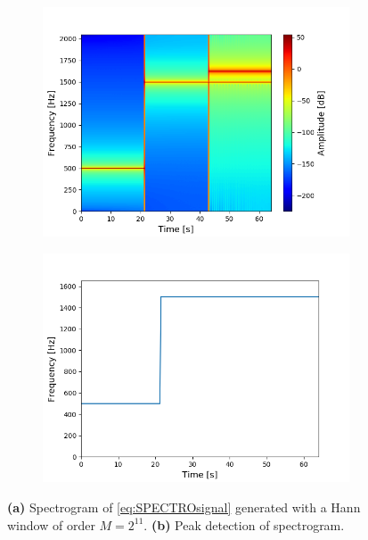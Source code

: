 \begin{figure}[H]
\centering
\begin{subfigure}{0.49\textwidth}
\centering
\includegraphics[width=\textwidth]{figures/validation/stft/peak/spectro2048.png}
\caption{}
\label{fig:2048spec}
\end{subfigure}
\begin{subfigure}{0.49\textwidth}
\centering
\includegraphics[width=\textwidth]{figures/validation/stft/peak/peak2048.png}
\caption{}
\label{fig:2048peak}
\end{subfigure}
\caption{\textbf{(a)} Spectrogram of \eqref{eq:SPECTROsignal} generated with a Hann window of order $M=2^{11}$. \textbf{(b)} Peak detection of spectrogram.}
\label{fig:2048}
\end{figure}
